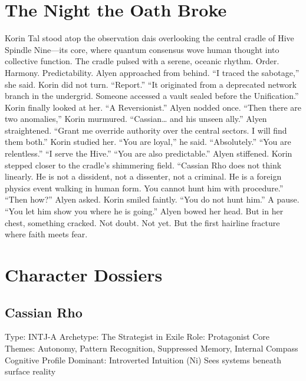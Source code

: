 \documentclass[12pt,oneside]{book}
\begin{document}

\chapter{The Night the Oath Broke}

Korin Tal stood atop the observation dais overlooking the central cradle of Hive Spindle Nine—its core, where quantum consensus wove human thought into collective function. The cradle pulsed with a serene, oceanic rhythm.
Order.
Harmony.
Predictability.
Alyen approached from behind.
“I traced the sabotage,” she said.
Korin did not turn. “Report.”
“It originated from a deprecated network branch in the undergrid. Someone accessed a vault sealed before the Unification.”
Korin finally looked at her. “A Reversionist.”
Alyen nodded once.
“Then there are two anomalies,” Korin murmured. “Cassian… and his unseen ally.”
Alyen straightened. “Grant me override authority over the central sectors. I will find them both.”
Korin studied her.
“You are loyal,” he said.
“Absolutely.”
“You are relentless.”
“I serve the Hive.”
“You are also predictable.”
Alyen stiffened.
Korin stepped closer to the cradle’s shimmering field.
“Cassian Rho does not think linearly. He is not a dissident, not a dissenter, not a criminal. He is a foreign physics event walking in human form. You cannot hunt him with procedure.”
“Then how?” Alyen asked.
Korin smiled faintly.
“You do not hunt him.”
 A pause.
 “You let him show you where he is going.”
Alyen bowed her head.
But in her chest, something cracked.
Not doubt.
Not yet.
But the first hairline fracture where faith meets fear.



\appendix

\chapter{Character Dossiers}

\section{Cassian Rho}

Type: INTJ-A
 Archetype: The Strategist in Exile
 Role: Protagonist
 Core Themes: Autonomy, Pattern Recognition, Suppressed Memory, Internal Compass
Cognitive Profile
Dominant: Introverted Intuition (Ni)
Sees systems beneath surface reality
\end{document}
